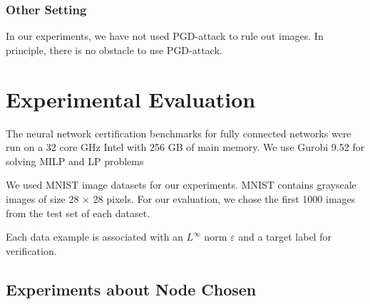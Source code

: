 \documentclass{llncs}
\begin{document}
%
%
%
%
%

\subsubsection*{Other Setting}

In our experiments, we have not used PGD-attack to rule out images. In principle, there is no obstacle to use PGD-attack.



\section{Experimental Evaluation}

The neural network certification benchmarks for fully connected networks were run on a 32 core
GHz Intel with 256 GB of main memory. We use Gurobi 9.52 for solving MILP and LP problems


We used MNIST image datasets for our experiments. MNIST contains grayscale images of size 28 × 28 pixels. For our evaluation, we chose the first
1000 images from the test set of each dataset.

Each data example is associated with an $L^\infty$ norm $\varepsilon$ and a target label
for verification.

\subsection{Experiments about Node Chosen}
\end{document}
